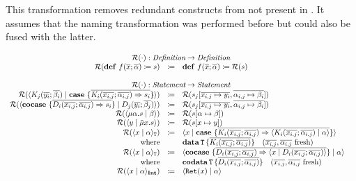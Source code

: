 This transformation removes redundant constructs from {\targetlang} not present in \machinelang.
It assumes that the naming transformation was performed before but could also be fused with the latter.

\[
  \begin{array}{rcll}
    \multicolumn{4}{c}{\redundancy{\cdot} : \emph{Definition} \rightarrow \emph{Definition}}\\
    \redundancy{\defi{f(\overline{x}; \overline{\alpha})}{s}} & \coloneq & \defi{f(\overline{x}; \overline{\alpha})}{\redundancy{s}} & \\
    \\
    \multicolumn{4}{c}{\redundancy{\cdot} : \emph{Statement} \rightarrow \emph{Statement}}\\
    \redundancy{\cut{K_j(\overline{y_i}; \overline{\beta_i})}{\case{\overline{K_i(\overline{x_{i,j}}; \overline{\alpha_{i,j}}) \Rightarrow s_i}}}} & \coloneq & \redundancy{s_j[\overline{x_{i,j} \mapsto y_i}, \overline{\alpha_{i,j} \mapsto \beta_i}]} & \\
    \redundancy{\cut{\cocase{\overline{D_i(\overline{x_{i,j}}; \overline{\alpha_{i,j}}) \Rightarrow s_i}}}{D_j(\overline{y_i}; \overline{\beta_j})}} & \coloneq & \redundancy{s_j[\overline{x_{i,j} \mapsto y_i}, \overline{\alpha_{i,j} \mapsto \beta_i}]} & \\
    \redundancy{\cut{\mu\alpha.s}{\beta}} & \coloneq & \redundancy{s[\alpha \mapsto \beta]} & \\
    \redundancy{\cut{y}{\tilde{\mu}x.s}} & \coloneq & \redundancy{s[x \mapsto y]} & \\
    \redundancy{\cut{x}{\alpha}_\mathtt{T}} & \coloneq & \cut{x}{\case{\overline{K_i(\overline{x_{i,j}}; \overline{\alpha_{i,j}}) \Rightarrow \cut{K_i(\overline{x_{i,j}}; \overline{\alpha_{i,j}})}{\alpha}}}} & \\
    \text{where} &  & \data{T}{\overline{K_i(\overline{x_{i,j}}; \overline{\alpha_{i,j}})}} \quad \fresh{\overline{x_{i,j}}, \overline{\alpha_{i,j}}} & \\
    \redundancy{\cut{x}{\alpha}_\mathtt{T}} & \coloneq & \cut{\cocase{\overline{D_i(\overline{x_{i,j}}; \overline{\alpha_{i,j}}) \Rightarrow \cut{x}{D_i(\overline{x_{i,j}}; \overline{\alpha_{i,j}})}}}}{\alpha} & \\
    \text{where} &  & \codata{T}{\overline{D_i(\overline{x_{i,j}}; \overline{\alpha_{i,j}})}} \quad \fresh{\overline{x_{i,j}}, \overline{\alpha_{i,j}}} & \\
    \redundancy{\cut{x}{\alpha}_\tyint} & \coloneq & \cut{\mathtt{Ret}(x)}{\alpha} & \\

\end{array}\]
